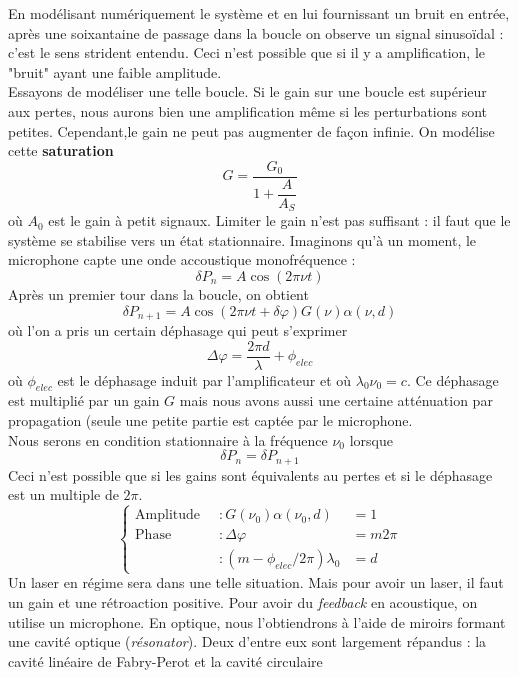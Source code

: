 	En modélisant numériquement le système et en lui fournissant un bruit en entrée, après une soixantaine de 
	passage dans la boucle on observe un signal sinusoïdal : c'est le sens strident entendu. Ceci n'est possible 
	que si il y a amplification, le "bruit" ayant une faible amplitude.\\
	
	Essayons de modéliser une telle boucle. Si le gain sur une boucle est supérieur aux pertes, nous aurons bien 
	une amplification même si les perturbations sont petites. Cependant,le gain ne peut pas augmenter de façon
	infinie. On modélise cette \textbf{saturation}
	\begin{equation}
	G = \dfrac{G_0}{1+\dfrac{A}{A_S}}
	\end{equation}
	où $A_0$ est le gain à petit signaux. Limiter le gain n'est pas suffisant : il faut que le système se 
	stabilise vers un état stationnaire. Imaginons qu'à un moment, le microphone capte une onde accoustique 
	monofréquence :
	\begin{equation}
	\delta P_n = A\cos(2\pi\nu t)
	\end{equation}
	Après un premier tour dans la boucle, on obtient
	\begin{equation}
	\delta P_{n+1} = A\cos(2\pi\nu t+\delta\varphi)G(\nu)\alpha(\nu,d)
	\end{equation}
	où l'on a pris un certain déphasage qui peut s’exprimer 
	\begin{equation}
	\Delta\varphi = \frac{2\pi d}{\lambda}+\phi_{elec}
	\end{equation}
	où $\phi_{elec}$ est le déphasage induit par l'amplificateur et où $\lambda_0\nu_0=c$. Ce déphasage est 
	multiplié par un gain $G$ mais nous avons aussi une certaine atténuation par propagation (seule une 
	petite partie est captée par le microphone.\\
		
	Nous serons en condition stationnaire à la fréquence $\nu_0$ lorsque
	\begin{equation}
	\delta P_n=\delta P_{n+1}
	\end{equation}
	Ceci n'est possible que si les gains sont équivalents au pertes et si le déphasage est un multiple de $2\pi$.
	\begin{equation}
	\left\{\begin{array}{lll}
	\text{Amplitude } &\ : G(\nu_0)\alpha(\nu_0,d) &= 1\\
	\text{Phase } &\ : \Delta\varphi &= m2\pi\\	
	&\ : (m-\phi_{elec}/2\pi)\lambda_0 &= d
	\end{array}\right.
	\end{equation}
	Un laser en régime sera dans une telle situation. Mais pour avoir un laser, il faut un gain et une 
	rétroaction positive. Pour avoir du \textit{feedback} en acoustique, on utilise un microphone. En 
	optique, nous l'obtiendrons à l'aide de miroirs formant une cavité optique (\textit{résonator}). Deux 
	d'entre eux sont largement répandus : la cavité linéaire de Fabry-Perot et la cavité circulaire
	
